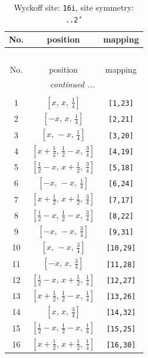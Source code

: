 \documentclass[fleqn,8pt]{jsarticle}
\begin{document}
\begin{longtable}{ccc}
\caption{Wyckoff site: {\tt 16i}, site symmetry: {\tt ..2'}}
 \\
 \hline \hline
No. & position & mapping \\ \hline \endfirsthead

\multicolumn{2}{l}{\tablename\ \thetable{}} \\
 \hline \hline
No. & position & mapping \\ \hline \endhead

 \hline \hline
\multicolumn{2}{r}{\footnotesize\it continued ...} \\ \endfoot

 \hline \hline
\multicolumn{2}{r}{} \\ \endlastfoot

1 & $\left[ x,\, x,\, \frac{1}{4} \right]$ & {\tt [1,23]} \\ \hline
2 & $\left[ - x,\, x,\, \frac{1}{4} \right]$ & {\tt [2,21]} \\ \hline
3 & $\left[ x,\, - x,\, \frac{1}{4} \right]$ & {\tt [3,20]} \\ \hline
4 & $\left[ x + \frac{1}{2},\, \frac{1}{2} - x,\, \frac{3}{4} \right]$ & {\tt [4,19]} \\ \hline
5 & $\left[ \frac{1}{2} - x,\, x + \frac{1}{2},\, \frac{3}{4} \right]$ & {\tt [5,18]} \\ \hline
6 & $\left[ - x,\, - x,\, \frac{1}{4} \right]$ & {\tt [6,24]} \\ \hline
7 & $\left[ x + \frac{1}{2},\, x + \frac{1}{2},\, \frac{3}{4} \right]$ & {\tt [7,17]} \\ \hline
8 & $\left[ \frac{1}{2} - x,\, \frac{1}{2} - x,\, \frac{3}{4} \right]$ & {\tt [8,22]} \\ \hline
9 & $\left[ - x,\, - x,\, \frac{3}{4} \right]$ & {\tt [9,31]} \\ \hline
10 & $\left[ x,\, - x,\, \frac{3}{4} \right]$ & {\tt [10,29]} \\ \hline
11 & $\left[ - x,\, x,\, \frac{3}{4} \right]$ & {\tt [11,28]} \\ \hline
12 & $\left[ \frac{1}{2} - x,\, x + \frac{1}{2},\, \frac{1}{4} \right]$ & {\tt [12,27]} \\ \hline
13 & $\left[ x + \frac{1}{2},\, \frac{1}{2} - x,\, \frac{1}{4} \right]$ & {\tt [13,26]} \\ \hline
14 & $\left[ x,\, x,\, \frac{3}{4} \right]$ & {\tt [14,32]} \\ \hline
15 & $\left[ \frac{1}{2} - x,\, \frac{1}{2} - x,\, \frac{1}{4} \right]$ & {\tt [15,25]} \\ \hline
16 & $\left[ x + \frac{1}{2},\, x + \frac{1}{2},\, \frac{1}{4} \right]$ & {\tt [16,30]} \\
\end{longtable}
\end{document}
